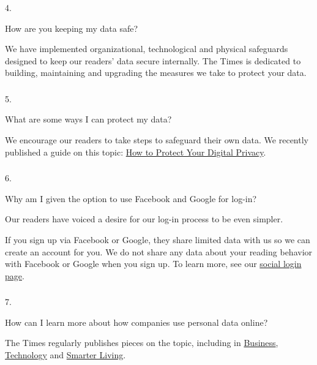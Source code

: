 4.

How are you keeping my data safe?

We have implemented organizational, technological and physical
safeguards designed to keep our readers' data secure internally. The
Times is dedicated to building, maintaining and upgrading the measures
we take to protect your data.

\hypertarget{-4}{%
\subsubsection{}\label{-4}}

5.

What are some ways I can protect my data?

We encourage our readers to take steps to safeguard their own data. We
recently published a guide on this topic:
\href{https://www.nytimes3xbfgragh.onion/guides/privacy-project/how-to-protect-your-digital-privacy}{How
to Protect Your Digital Privacy}.

\hypertarget{-5}{%
\subsubsection{}\label{-5}}

6.

Why am I given the option to use Facebook and Google for log-in?

Our readers have voiced a desire for our log-in process to be even
simpler.

If you sign up via Facebook or Google, they share limited data with us
so we can create an account for you. We do not share any data about your
reading behavior with Facebook or Google when you sign up. To learn
more, see our
\href{https://help.nytimes3xbfgragh.onion/hc/en-us/articles/115014887628-Social-login}{social
login page}.

\hypertarget{-6}{%
\subsubsection{}\label{-6}}

7.

How can I learn more about how companies use personal data online?

The Times regularly publishes pieces on the topic, including in
\href{https://www.nytimes3xbfgragh.onion/2019/11/04/business/secret-consumer-score-access.html}{Business},
\href{https://www.nytimes3xbfgragh.onion/2019/11/19/technology/artificial-intelligence-dawn-song.html}{Technology}
and
\href{https://www.nytimes3xbfgragh.onion/2019/11/24/smarter-living/privacy-online-how-to-stop-advertiser-tracking-opt-out.html}{Smarter
Living}.

